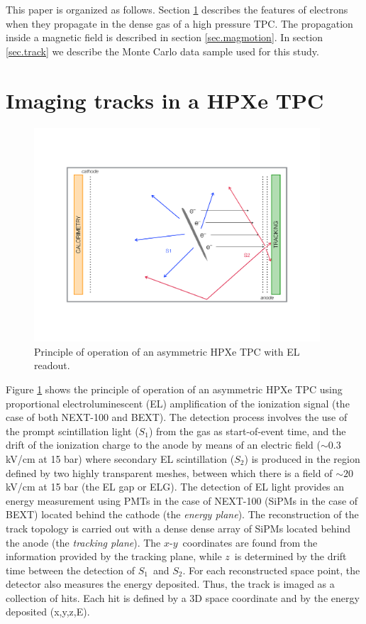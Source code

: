 \documentclass{JINST}
\begin{document}
This paper is organized as follows. Section \ref{sec.topology} describes the features of electrons when they propagate in the dense gas of a high pressure TPC.  The propagation inside a magnetic field is described in section \ref{sec.magmotion}. In section \ref{sec.track} we describe the Monte Carlo data sample used for this study. 

\section{Imaging tracks in a HPXe TPC}
\label{sec.topology}

\begin{figure}[!htb]
\centering
\includegraphics[width= 0.95\textwidth]{img/SoftAsymmetric.pdf}
\caption{Principle of operation of an asymmetric HPXe TPC with EL readout.} \label{fig.SS}
\end{figure}

Figure \ref{fig.SS} shows the principle of operation of an asymmetric HPXe TPC using proportional electroluminescent (EL) amplification of the ionization signal (the case of both NEXT-100 and BEXT). The detection process involves the use of the prompt scintillation light ($S_1$) from the gas as start-of-event time, and the drift of the ionization charge to the anode by means of an electric field ($\sim0.3$ kV/cm at 15 bar) where secondary EL scintillation ($S_2$) is produced in the region defined by two highly transparent meshes, between which there is a field of $\sim20$ kV/cm at 15 bar
(the EL gap or ELG). The detection of EL light provides an energy measurement using PMTs in the case of NEXT-100 (SiPMs in the case of BEXT) located behind the cathode (the \emph{energy plane}). The reconstruction of the track topology is carried out with a dense dense array of SiPMs located behind the anode (the \emph{tracking plane}). The $x$-$y$~coordinates are found from the information provided by the tracking plane, while $z$~is determined by the drift time between the detection of $S_1$~and $S_2$. For each reconstructed space point, the detector also measures the energy deposited. Thus, the track is imaged as a collection of hits. Each hit is defined by a 3D space coordinate and by the energy deposited (x,y,z,E).
\end{document}

